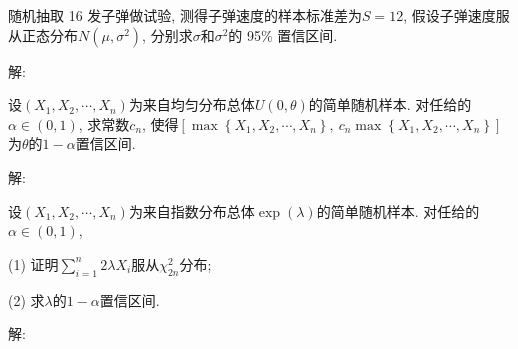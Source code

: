 \documentclass[standard]{ExBook}
\begin{document}
\begin{qitems}
\vspace{-5em}

    \begin{bbox}
    \begin{shaded}
        \qitem
随机抽取 16 发子弹做试验, 测得子弹速度的样本标准差为$S = 12$, 假设子弹速度服从正态分布$N(\mu,\sigma^2)$, 分别求$\sigma$和$\sigma^2$的 95\% 置信区间.
    \end{shaded}
    \end{bbox}

\vspace{-5em}

    \begin{bbox}
解: 
    \end{bbox}

\vspace{-5em}

    \begin{bbox}
    \begin{shaded}
        \qitem
设$(X_1,X_2,\cdots,X_n)$为来自均匀分布总体$U(0,\theta)$的简单随机样本. 对任给的$\alpha \in (0,1)$, 求常数$c_n$, 使得$\left[\max\left\{X_1,X_2,\cdots,X_n\right\},\ c_n \max\left\{X_1,X_2,\cdots,X_n\right\}\right]$为$\theta$的$1-\alpha$置信区间.
    \end{shaded}
    \end{bbox}

\vspace{-5em}

    \begin{bbox}
解: 
    \end{bbox}

\vspace{-5em}

    \begin{bbox}
    \begin{shaded}
        \qitem
设$(X_1,X_2,\cdots,X_n)$为来自指数分布总体$\exp(\lambda)$的简单随机样本. 对任给的$\alpha\in(0,1)$,

(1) 证明$\sum\limits_{i=1}^{n}2\lambda X_i$服从$\chi_{2n}^{2}$分布;

(2) 求$\lambda$的$1-\alpha$置信区间.
    \end{shaded}
    \end{bbox}

\vspace{-5em}

    \begin{bbox}
解: 
    \end{bbox}

\vspace{-5em}


\end{qitems}
\end{document}
